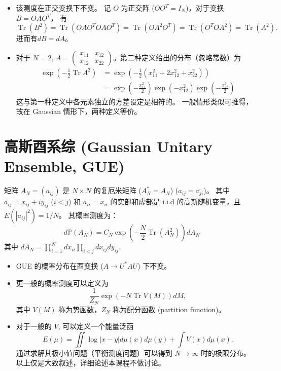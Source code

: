 \begin{remark}
\begin{itemize}
    \item[a)] 该测度在正交变换下不变。
    记 $O$ 为正交阵 ($OO^T = I_N$)，对于变换 $B = OAO^T$，
    有
     \[\operatorname{Tr}(B^2) = \operatorname{Tr}(OAO^T OAO^T) 
     = \operatorname{Tr}(O A^2 O^T) = \operatorname{Tr}(O^T O A^2) 
     = \operatorname{Tr}(A^2).\]
     进而有$dB=dA$。
    \item[b)] 对于 $N=2$, 
    $A=\begin{pmatrix} x_{11} & x_{12} \\ x_{12} & x_{22} \end{pmatrix}$。第二种定义给出的分布（忽略常数）为 
    \begin{equation*}
        \begin{aligned}
            \exp(-\frac{1}{2} \operatorname{Tr} A^2) &= \exp(-\frac{1}{2}(x_{11}^2 + 2x_{12}^2 + x_{22}^2)) \\
            &= \exp(-\frac{x_{11}^2}{2})\exp(-x_{12}^2)\exp(-\frac{x_{22}^2}{2})
        \end{aligned}
    \end{equation*}
    这与第一种定义中各元素独立的方差设定是相符的。
    一般情形类似可推得，故在 Gaussian 情形下，两种定义等价。
\end{itemize}
\end{remark}

\section{高斯酉系综 (Gaussian Unitary Ensemble, GUE)}
\begin{definition}[GUE]
矩阵 $A_N = (a_{ij})$ 是 $N \times N$ 的复厄米矩阵 ($A_N^* = A_N$) ($a_{ij} = \overline{a_{ji}}$)。
其中 $a_{ij} = x_{ij} + i y_{ij}$ ($i<j$) 和 $a_{ii} = x_{ii}$ 的实部和虚部是 i.i.d 的高斯随机变量，且 $E(|a_{ij}|^2) = 1/N$。
其概率测度为：
\[ d\mathbb{P}(A_N) = C_N \exp\left(-\frac{N}{2} \operatorname{Tr}(A_N^2)\right) dA_N \]
其中 $dA_N = \prod\limits_{i=1}^N dx_{ii} \prod\limits_{i<j} dx_{ij} dy_{ij}$.
\end{definition}

\begin{remark}
\begin{itemize}
    \item[a)] GUE 的概率分布在酉变换 ($A \to U^*AU$) 下不变。
    \item[b)] 更一般的概率测度可以定义为
    \[\frac{1}{Z_N} \exp(-N \operatorname{Tr} V(M)) dM,\]
    其中 $V(M)$ 称为势函数，$Z_N$ 称为配分函数 (partition function)。
    \item 对于一般的 $V$, 可以定义一个能量泛函 
    \[E(\mu) = \iint \log|x-y| d\mu(x)d\mu(y) + \int V(x) d\mu(x).\]
    通过求解其极小值问题（平衡测度问题）可以得到 $N\to\infty$ 时的极限分布。
    以上仅是大致叙述，详细论述本课程不做讨论。
\end{itemize}
\end{remark}

